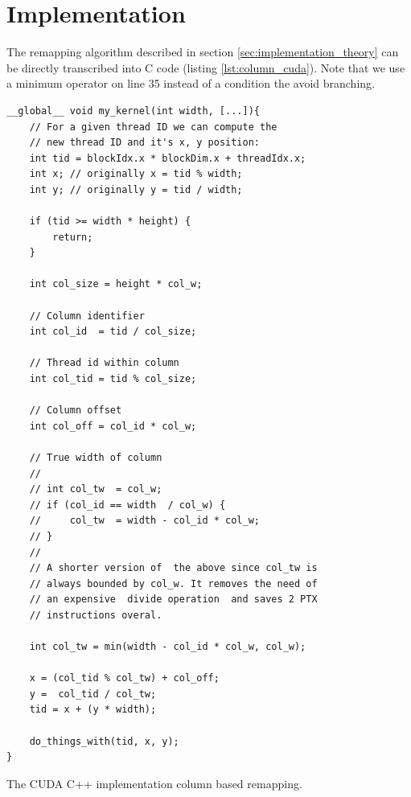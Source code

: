 \section{Implementation}

The remapping algorithm described in section \ref{sec:implementation_theory} can be directly transcribed into C code (listing \ref{lst:column_cuda}).
Note that we use a minimum operator on line 35 instead of a condition the avoid branching.

\begin{listing}[ht]
    \begin{verbatim}
__global__ void my_kernel(int width, [...]){
    // For a given thread ID we can compute the 
    // new thread ID and it's x, y position:
    int tid = blockIdx.x * blockDim.x + threadIdx.x;
    int x; // originally x = tid % width;
    int y; // originally y = tid / width;

    if (tid >= width * height) {
        return;
    }

    int col_size = height * col_w;

    // Column identifier
    int col_id  = tid / col_size;

    // Thread id within column
    int col_tid = tid % col_size;

    // Column offset
    int col_off = col_id * col_w;

    // True width of column
    //
    // int col_tw  = col_w;
    // if (col_id == width  / col_w) {
    //     col_tw  = width - col_id * col_w;
    // }
    //
    // A shorter version of  the above since col_tw is 
    // always bounded by col_w. It removes the need of 
    // an expensive  divide operation  and saves 2 PTX
    // instructions overal. 
    
    int col_tw = min(width - col_id * col_w, col_w);

    x = (col_tid % col_tw) + col_off;
    y =  col_tid / col_tw;
    tid = x + (y * width);

    do_things_with(tid, x, y);
}
    \end{verbatim}
    \caption{
        The CUDA C++ implementation column based remapping.
    }
    \label{lst:column_cuda}
\end{listing}

